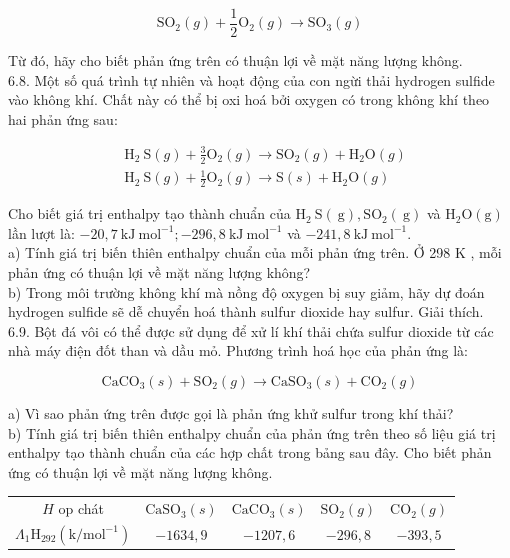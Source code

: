 \documentclass[10pt]{article}
\begin{document}
$$
\mathrm{SO}_{2}(g)+\frac{1}{2} \mathrm{O}_{2}(g) \rightarrow \mathrm{SO}_{3}(g)
$$

Từ đó, hãy cho biết phản ứng trên có thuận lợi về mặt năng lượng không.\\
6.8. Một số quá trình tự nhiên và hoạt động của con ngừi thải hydrogen sulfide vào không khí. Chất này có thể bị oxi hoá bởi oxygen có trong không khí theo hai phản ứng sau:


\begin{align*}
& \mathrm{H}_{2} \mathrm{~S}(g)+\frac{3}{2} \mathrm{O}_{2}(g) \rightarrow \mathrm{SO}_{2}(g)+\mathrm{H}_{2} \mathrm{O}(g)  \tag{1}\\
& \mathrm{H}_{2} \mathrm{~S}(g)+\frac{1}{2} \mathrm{O}_{2}(g) \rightarrow \mathrm{S}(s)+\mathrm{H}_{2} \mathrm{O}(g) \tag{2}
\end{align*}


Cho biết giá trị enthalpy tạo thành chuẩn của $\mathrm{H}_{2} \mathrm{~S}(\mathrm{~g}), \mathrm{SO}_{2}(\mathrm{~g})$ và $\mathrm{H}_{2} \mathrm{O}(\mathrm{g})$ lần lượt là: $-20,7 \mathrm{~kJ} \mathrm{~mol}^{-1} ;-296,8 \mathrm{~kJ} \mathrm{~mol}^{-1}$ và $-241,8 \mathrm{~kJ} \mathrm{~mol}^{-1}$.\\
a) Tính giá trị biến thiên enthalpy chuẩn của mỗi phản ứng trên. Ở 298 K , mỗi phản ứng có thuận lợi về mặt năng lượng không?\\
b) Trong môi trường không khí mà nồng độ oxygen bị suy giảm, hãy dự đoán hydrogen sulfide sẽ dễ chuyển hoá thành sulfur dioxide hay sulfur. Giải thích.\\
6.9. Bột đá vôi có thể được sử dụng để xử lí khí thải chứa sulfur dioxide từ các nhà máy điện đốt than và dầu mỏ. Phương trình hoá học của phản ứng là:

$$
\mathrm{CaCO}_{3}(s)+\mathrm{SO}_{2}(g) \rightarrow \mathrm{CaSO}_{3}(s)+\mathrm{CO}_{2}(g)
$$

a) Vì sao phản ứng trên được gọi là phản ứng khử sulfur trong khí thải?\\
b) Tính giá trị biến thiên enthalpy chuẩn của phản ứng trên theo số liệu giá trị enthalpy tạo thành chuẩn của các hợp chất trong bảng sau đây. Cho biết phản ứng có thuận lợi về mặt năng lượng không.

\begin{center}
\begin{tabular}{|c|c|c|c|c|}
\hline
$H$ op chát & $\mathrm{CaSO}_{3}(s)$ & $\mathrm{CaCO}_{3}(s)$ & $\mathrm{SO}_{2}(g)$ & $\mathrm{CO}_{2}(g)$ \\
\hdashline
$\Lambda_{1} \mathrm{H}_{292}\left(\mathrm{k} / \mathrm{mol}^{-1}\right)$ & $-1634,9$ & $-1207,6$ & $-296,8$ & $-393,5$ \\
\hline
\end{tabular}
\end{center}
\end{document}
